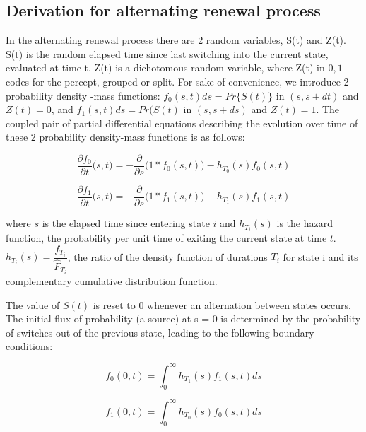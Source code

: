 \subsection{Derivation for alternating renewal process}
In the alternating renewal process there are 2 random variables, S(t) and Z(t). S(t) is the random elapsed time since last switching into the current state, evaluated at time t. Z(t) is a dichotomous random variable, where Z(t) in ${0,1}$ codes for the percept, grouped or split. For sake of convenience, we introduce 2 probability density -mass functions: $f_0(s,t) ds = Pr \lbrace S(t) \rbrace$ in $(s,s+dt)$ and $Z(t)=0$, and $f_1(s,t) ds= Pr(S(t)$ in $(s,s+ds)$ and $Z(t)=1$. The coupled pair of partial differential equations describing the evolution over time of these 2 probability density-mass functions is as follows:

\begin{equation}
\frac{\partial f_0}{\partial t} \big(s,t\big) = -\frac{\partial}{\partial s}\big(1 * f_0(s,t)\big) - h_{T_0}(s) f_0(s,t)
\end{equation}

\begin{equation}
\frac{\partial f_1}{\partial t} \big(s,t\big) = -\frac{\partial}{\partial s} \big(1 * f_1(s,t)\big) - h_{T_1}(s) f_1(s,t)
\end{equation}

where $s$ is the elapsed time since entering state $i$ and $h_{T_i}(s)$ is the hazard function, the probability per unit time of exiting the current state at time $t$. $h_{T_i}(s) = \dfrac{f_{T_i}}{\hat{F}_{T_i}}$, the ratio of the density function of durations $T_i$ for state i and its complementary cumulative distribution function.

The value of $S(t)$ is reset to 0 whenever an alternation between states occurs. The initial flux of probability (a source) at s = 0 is determined by the probability of switches out of the previous state, leading to the following boundary conditions:

\begin{equation}
f_0(0,t) = \int_0^\infty h_{T_1}(s) f_1(s,t) ds
\end{equation}

\begin{equation}
f_1(0,t) = \int_0^\infty h_{T_0}(s) f_0(s,t) ds
\end{equation}

